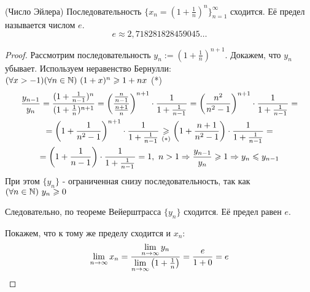 \begin{theorem} (Число Эйлера)
	Последовательность $\{x_n = \left(1 +
	\frac{1}{n}\right)^n\}_{n = 1}^\infty$ сходится.
	Её предел называется числом $e$.
	\[
		e \approx 2,718281828459045\dots
	\]
\end{theorem}

\begin{proof}
	Рассмотрим последовательность $y_n :=
	\left(1 + \frac{1}{n}\right)^{n + 1}$.
	Докажем, что $y_n$ убывает. Используем неравенство Бернулли:
	$(\forall x > -1)(\forall n \in \mathbb{N})\ (1 + x)^{n} \geqslant 1 + nx$ (*)
	\begin{multline*}
		\frac{y_{n - 1}}{y_n} = \frac{(1 + \frac{1}{n - 1})^n}
		{(1 + \frac{1}{n})^{n + 1}} = \left(\frac{\frac{n}{n - 1}}
		{\frac{n + 1}{n}}\right)^{n+1} \cdot \frac{1}{1 + \frac{1}
		{n - 1}} = \left(\frac{n^2}{n^2 - 1}\right)^{n+1}
		\cdot \frac{1}{1 + \frac{1}{n - 1}} = 
		\\
		=\left(1 + \frac{1}{n^2 - 1}\right)^{n+1} \cdot
		\frac{1}{1 + \frac{1}{n - 1}} \underset{(*)}{\geqslant}
		\left(1 + \frac{n + 1}
		{n^2 - 1}\right) \cdot \frac{1}{1 + \frac{1}{n - 1}} = 
		\\
		=\left(1 + \frac{1}{n - 1}\right) \cdot \frac{1}{1 + 
		\frac{1}{n - 1}} = 1,\  n > 1 \Rightarrow \frac{y_{n - 1}}{y_n}
		\geqslant 1 \Rightarrow y_n \leqslant y_{n - 1}
	\end{multline*}
	При этом $\{y_n\}$ - ограниченная снизу последовательность,
	так как $(\forall n \in \mathbb{N})\ y_n \geqslant 0$
	
	Следовательно, по теореме Вейерштрасса $\{y_n\}$ сходится.
	Её предел равен $e$.
	
	Покажем, что к тому же пределу сходится и $x_n$:
	\[
		\lim\limits_{n \to \infty} x_n = 
		\frac{\lim\limits_{n \to \infty} y_n }{\lim\limits_{n \to \infty}
		\left(1 + \frac{1}{n}\right)} = \frac{e}{1 + 0} = e
	\]
\end{proof}